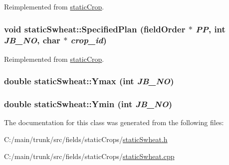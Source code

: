 Reimplemented from \hyperlink{classstatic_crop_ab7763e4e6a0b9eff1788cb86ebad8170}{staticCrop}.\hypertarget{classstatic_swheat_aed34827923084a78c1f9e448460f8ba3}{
\subsubsection[{SpecifiedPlan}]{\setlength{\rightskip}{0pt plus 5cm}void staticSwheat::SpecifiedPlan ({\bf fieldOrder} $\ast$ {\em PP}, \/  int {\em JB\_\-NO}, \/  char $\ast$ {\em crop\_\-id})}}
\label{classstatic_swheat_aed34827923084a78c1f9e448460f8ba3}


Reimplemented from \hyperlink{classstatic_crop_af19d8a1e4f4833325f6712c22ede8b45}{staticCrop}.\hypertarget{classstatic_swheat_af7ac1b9fb4c79a58c7f03dfbaf3d0500}{
\subsubsection[{Ymax}]{\setlength{\rightskip}{0pt plus 5cm}double staticSwheat::Ymax (int {\em JB\_\-NO})}}
\label{classstatic_swheat_af7ac1b9fb4c79a58c7f03dfbaf3d0500}
\hypertarget{classstatic_swheat_a9da2b7c6551c0fd237a0bdd7c4cfada3}{
\subsubsection[{Ymin}]{\setlength{\rightskip}{0pt plus 5cm}double staticSwheat::Ymin (int {\em JB\_\-NO})}}
\label{classstatic_swheat_a9da2b7c6551c0fd237a0bdd7c4cfada3}


The documentation for this class was generated from the following files:\begin{DoxyCompactItemize}
\item 
C:/main/trunk/src/fields/staticCrops/\hyperlink{static_swheat_8h}{staticSwheat.h}\item 
C:/main/trunk/src/fields/staticCrops/\hyperlink{static_swheat_8cpp}{staticSwheat.cpp}\end{DoxyCompactItemize}
